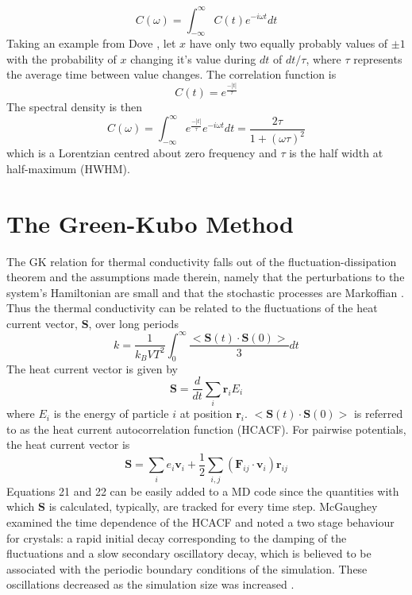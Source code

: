 \documentclass[aps,prb,preprint,preprintnumbers,amsmath,amssymb,floatfix,superscriptaddress]{revtex4}
\begin{document}
%
\begin{equation}
C(\omega)=\int_{-\infty}^{\infty}C(t)e^{-i\omega t}dt
\end{equation}
%
Taking an example from Dove \cite{dove}, let $x$ have only two equally probably values of $\pm 1$ with the probability of $x$ changing it's value during $dt$ of $dt/\tau$, where $\tau$ represents the average time between value changes. The correlation function is
%
\begin{equation}
C(t)=e^{\frac{-|t|}{\tau}}
\end{equation}
%
The spectral density is then
\begin{equation}
C(\omega)=\int_{-\infty}^{\infty}e^{\frac{-|t|}{\tau}}e^{-i\omega t}dt=\frac{2\tau}{1+(\omega \tau )^2}
\end{equation}
which is a Lorentzian centred about zero frequency and $\tau$ is the half width at half-maximum (HWHM).
\section*{The Green-Kubo Method}

The GK relation for thermal conductivity falls out of the fluctuation-dissipation theorem and the assumptions made therein, namely that the perturbations to the system's Hamiltonian are small and that the stochastic processes are Markoffian \cite{green:398}. Thus the thermal conductivity can be related to the fluctuations of the heat current vector, $\pmb{S}$, over long periods
%
\begin{equation}
k=\frac{1}{k_B V T^2}\int_0^{\infty}\frac{<\pmb{S}(t)\cdot\pmb{S}(0)>}{3}dt
\end{equation}
%
The heat current vector is given by 
%
\begin{equation}
\pmb{S}=\frac{d}{dt}\sum_i\pmb{r}_iE_i
\end{equation}
%
where $E_i$ is the energy of particle $i$ at position $\pmb{r}_i$. $<\pmb{S}(t)\cdot\pmb{S}(0)>$ is referred to as the heat current autocorrelation function (HCACF). For pairwise potentials, the heat current vector is
%
\begin{equation}
\pmb{S}=\sum_ie_i\pmb{v}_i+\frac{1}{2}\sum_{i,j}(\pmb{F}_{ij}\cdot\pmb{v}_{i})\pmb{r}_{ij}
\end{equation}
%
Equations 21 and 22 can be easily added to a MD code since the quantities with which $\pmb{S}$ is calculated, typically, are tracked for every time step. McGaughey examined the time dependence of the HCACF and noted a two stage behaviour for crystals: a rapid initial decay corresponding to the damping of the fluctuations and a slow secondary oscillatory decay, which is believed to be associated with the periodic boundary conditions of the simulation. These oscillations decreased as the simulation size was increased \cite{mcgaugheythesis}.
\end{document}
